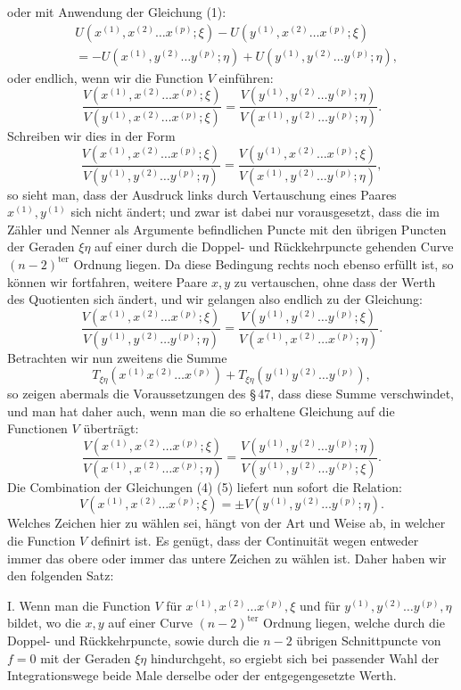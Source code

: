 \documentclass[10pt]{article}
\begin{document}
oder mit Anwendung der Gleichung (1):
\[
\begin{aligned}
&U(x^{(1)},x^{(2)}\ldots x^{(p)};\xi)-U(y^{(1)},x^{(2)}\ldots x^{(p)};\xi)\\
&
=-U(x^{(1)},y^{(2)}\ldots y^{(p)};\eta)+U(y^{(1)},y^{(2)}\ldots y^{(p)};\eta),
\end{aligned}
\]
oder endlich, wenn wir die Function \(V\) einführen:
\[
\tag{3}\frac{V(x^{(1)},x^{(2)}\ldots x^{(p)};\xi)}{V(y^{(1)},x^{(2)}\ldots x^{(p)};\xi)}
=\frac{V(y^{(1)},y^{(2)}\ldots y^{(p)};\eta)}{V(x^{(1)},y^{(2)}\ldots y^{(p)};\eta)}.
\]
Schreiben wir dies in der Form
\[
\frac{V(x^{(1)},x^{(2)}\ldots x^{(p)};\xi)}{V(y^{(1)},y^{(2)}\ldots y^{(p)};\eta)}
=\frac{V(y^{(1)},x^{(2)}\ldots x^{(p)};\xi)}{V(x^{(1)},y^{(2)}\ldots y^{(p)};\eta)},
\]
so sieht man, dass der Ausdruck links durch Vertauschung eines Paares \(x^{(1)},y^{(1)}\) sich nicht ändert; und zwar ist dabei nur vorausgesetzt, dass die im Zähler und Nenner als Argumente befindlichen Puncte mit den übrigen Puncten der Geraden \(\xi\eta\) auf einer durch die Doppel- und Rückkehrpuncte gehenden Curve \((n-2)^{\mathrm{ter}}\) Ordnung liegen. Da diese Bedingung rechts noch ebenso erfüllt ist, so können wir fortfahren, weitere Paare \(x,y\) zu vertauschen, ohne dass der Werth des Quotienten sich ändert, und wir gelangen also endlich zu der Gleichung:
\[
\tag{4}\frac{V(x^{(1)},x^{(2)}\ldots x^{(p)};\xi)}{V(y^{(1)},y^{(2)}\ldots y^{(p)};\eta)}
=\frac{V(y^{(1)},y^{(2)}\ldots y^{(p)};\xi)}{V(x^{(1)},x^{(2)}\ldots x^{(p)};\eta)}.
\]
Betrachten wir nun zweitens die Summe
\[
T_{\xi\eta}(x^{(1)}x^{(2)}\ldots x^{(p)})+T_{\xi\eta}(y^{(1)}y^{(2)}\ldots y^{(p)}),
\]
so zeigen abermals die Voraussetzungen des \S\,47, dass diese Summe verschwindet, und man hat daher auch, wenn man die so erhaltene Gleichung auf die Functionen \(V\) überträgt:
\[
\tag{5}\frac{V(x^{(1)},x^{(2)}\ldots x^{(p)};\xi)}{V(x^{(1)},x^{(2)}\ldots x^{(p)};\eta)}
=\frac{V(y^{(1)},y^{(2)}\ldots y^{(p)};\eta)}{V(y^{(1)},y^{(2)}\ldots y^{(p)};\xi)}.
\]
Die Combination der Gleichungen (4) (5) liefert nun sofort die Relation:
\[
V(x^{(1)},x^{(2)}\ldots x^{(p)};\xi)=\pm V(y^{(1)},y^{(2)}\ldots y^{(p)};\eta).
\]
Welches Zeichen hier zu wählen sei, hängt von der Art und Weise ab, in welcher die Function \(V\) definirt ist. Es genügt, dass der Continuität wegen entweder immer das obere oder immer das untere Zeichen zu wählen ist. Daher haben wir den folgenden Satz:

I. Wenn man die Function \(V\) für \(x^{(1)},x^{(2)}\ldots x^{(p)},\xi\) und für \(y^{(1)},y^{(2)}\ldots y^{(p)},\eta\) bildet, wo die \(x,y\) auf einer Curve \((n-2)^{\mathrm{ter}}\) Ordnung liegen, welche durch die Doppel- und Rückkehrpuncte, sowie durch die \(n-2\) übrigen Schnittpuncte von \(f=0\) mit der Geraden \(\xi\eta\) hindurchgeht, so ergiebt sich bei passender Wahl der Integrationswege beide Male derselbe oder der entgegengesetzte Werth.
\end{document}
